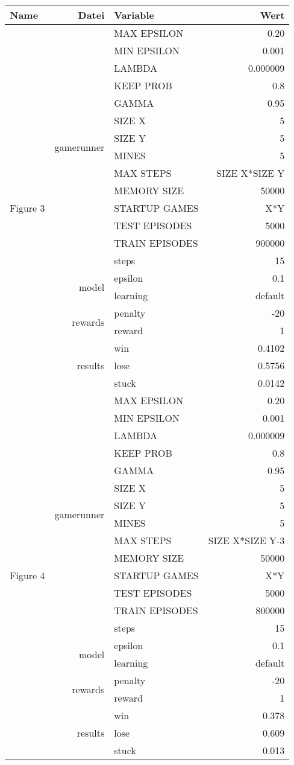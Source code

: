 \documentclass{article}
\begin{document}
\begin{tabularx}{\textwidth}{l|r|X|r}
	Name & Datei & Variable & Wert\\
\hline
\multirow{21}{*}{Figure 3} & \multirow{14}{*}{gamerunner} & MAX EPSILON	& 0.20\\
& & MIN EPSILON	& 0.001 \\
& & LAMBDA & 0.000009 \\
& & KEEP PROB & 0.8 \\
& & GAMMA	& 0.95 \\
& & SIZE X & 5 \\
& & SIZE Y & 5 \\
& & MINES & 5 \\
& & MAX STEPS & SIZE X*SIZE Y\\
& & MEMORY SIZE & 50000 \\
& & STARTUP GAMES & X*Y \\
& & TEST EPISODES & 5000 \\
& & TRAIN EPISODES & 900000 \\
& & steps & 15\\\cline{2-4}
& \multirow{2}{*}{model} & epsilon & 0.1\\
& & learning & default \\\cline{2-4}
& \multirow{2}{*}{rewards} & penalty	&-20\\
& & reward& 1\\\cline{2-4}
& \multirow{3}{*}{results} & win & 0.4102\\
& & lose & 0.5756\\
& & stuck & 0.0142\\
\hline
\hline
\multirow{21}{*}{Figure 4} & \multirow{14}{*}{gamerunner} & MAX EPSILON	& 0.20\\
& & MIN EPSILON	& 0.001 \\
& & LAMBDA & 0.000009 \\
& & KEEP PROB & 0.8 \\
& & GAMMA	& 0.95 \\
& & SIZE X & 5 \\
& & SIZE Y & 5 \\
& & MINES & 5 \\
& & MAX STEPS & SIZE X*SIZE Y-3\\
& & MEMORY SIZE & 50000 \\
& & STARTUP GAMES & X*Y \\
& & TEST EPISODES & 5000 \\
& & TRAIN EPISODES & 800000 \\
& & steps & 15\\\cline{2-4}
& \multirow{2}{*}{model} & epsilon & 0.1\\
& & learning & default \\\cline{2-4}
& \multirow{2}{*}{rewards} & penalty	&-20\\
& & reward& 1\\\cline{2-4}
& \multirow{3}{*}{results} & win & 0.378\\
& & lose & 0.609\\
& & stuck & 0.013\\
\hline
\end{tabularx}
\end{document}
